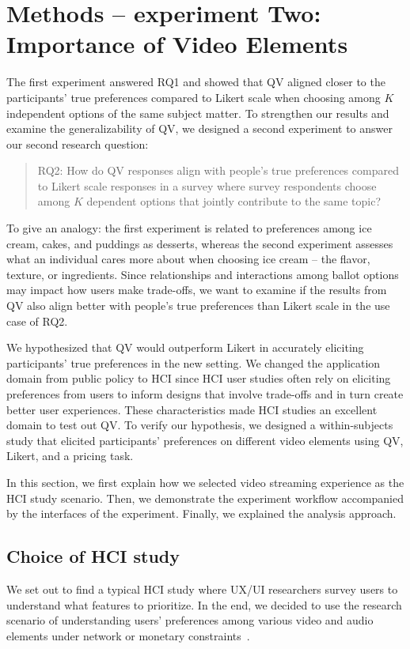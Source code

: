 \section{Methods -- experiment Two: Importance of Video Elements}
\label{method-2}
The first experiment answered RQ1 and showed that QV aligned closer to the participants' true preferences compared to Likert scale when choosing among $K$ independent options of the same subject matter. To strengthen our results and examine the generalizability of QV, we designed a second experiment to answer our second research question: \begin{quote}RQ2: How do QV responses align with people's true preferences compared to Likert scale responses in a survey where survey respondents choose among $K$ dependent options that jointly contribute to the same topic?\end{quote} To give an analogy: the first experiment is related to preferences among ice cream, cakes, and puddings as desserts, whereas the second experiment assesses what an individual cares more about when choosing ice cream -- the flavor, texture, or ingredients. Since relationships and interactions among ballot options may impact how users make trade-offs, we want to examine if the results from QV also align better with people's true preferences than Likert scale in the use case of RQ2.

We hypothesized that QV would outperform Likert in accurately eliciting participants' true preferences in the new setting. We changed the application domain from public policy to HCI since HCI user studies often rely on eliciting preferences from users to inform designs that involve trade-offs and in turn create better user experiences. These characteristics made HCI studies an excellent domain to test out QV. To verify our hypothesis, we designed a within-subjects study that elicited participants' preferences on different video elements using QV, Likert, and a pricing task. 

In this section, we first explain how we selected video streaming experience as the HCI study scenario. Then, we demonstrate the experiment workflow accompanied by the interfaces of the experiment. Finally, we explained the analysis approach.

\subsection{Choice of HCI study} \label{exp2-hci}
We set out to find a typical HCI study where UX/UI researchers survey users to understand what features to prioritize. In the end, we decided to use the research scenario of understanding users' preferences among various video and audio elements under network or monetary constraints~\cite{molnar2013comedy, oeldorf2012bad}.

